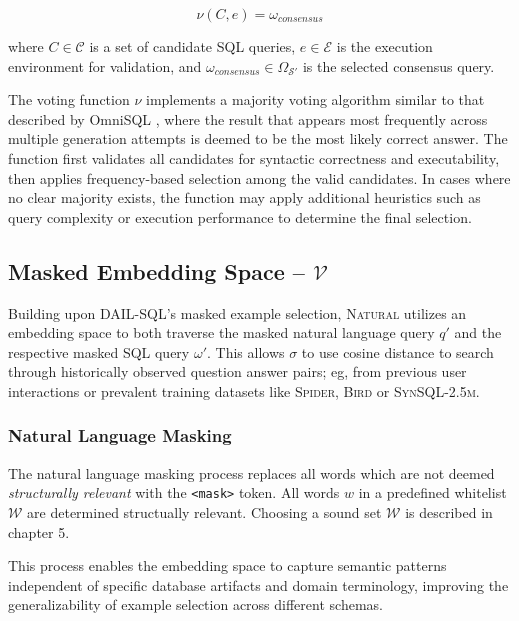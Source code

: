 $$
\nu(C, e) = \omega_{consensus}
$$

where $C \in \mathcal{C}$ is a set of candidate SQL queries, $e \in \mathcal{E}$ is
the execution environment for validation, and $\omega_{consensus} \in \Omega_{\mathcal{S}'}$
is the selected consensus query.

\vspace{0.5em}

The voting function $\nu$ implements a majority voting algorithm similar to that
described by OmniSQL \citep{OmniSQL}, where the result that appears most frequently
across multiple generation attempts is deemed to be the most likely correct answer.
The function first validates all candidates for syntactic correctness and executability,
then applies frequency-based selection among the valid candidates. In cases where
no clear majority exists, the function may apply additional heuristics such as query
complexity or execution performance to determine the final selection.

\subsection{Masked Embedding Space – $\mathcal{V}$}

Building upon DAIL-SQL's masked example selection, \textsc{Natural} utilizes an
embedding space to both traverse the masked natural language query $q'$
and the respective masked SQL query $\omega'$. This allows $\sigma$ to use
cosine distance to search through historically observed question answer pairs;
eg, from previous user interactions or prevalent training datasets like
\textsc{Spider}, \textsc{Bird} or \textsc{SynSQL-2.5m}.

\subsubsection{Natural Language Masking}

The natural language masking process replaces all words which are not deemed
\textit{structurally relevant} with the \texttt{<mask>} token. All words $w$
in a predefined whitelist $\mathcal{W}$ are determined structually relevant.
Choosing a sound set $\mathcal{W}$ is described in chapter 5.

This process enables the embedding space to capture semantic patterns independent
of specific database artifacts and domain terminology, improving the generalizability
of example selection across different schemas.

